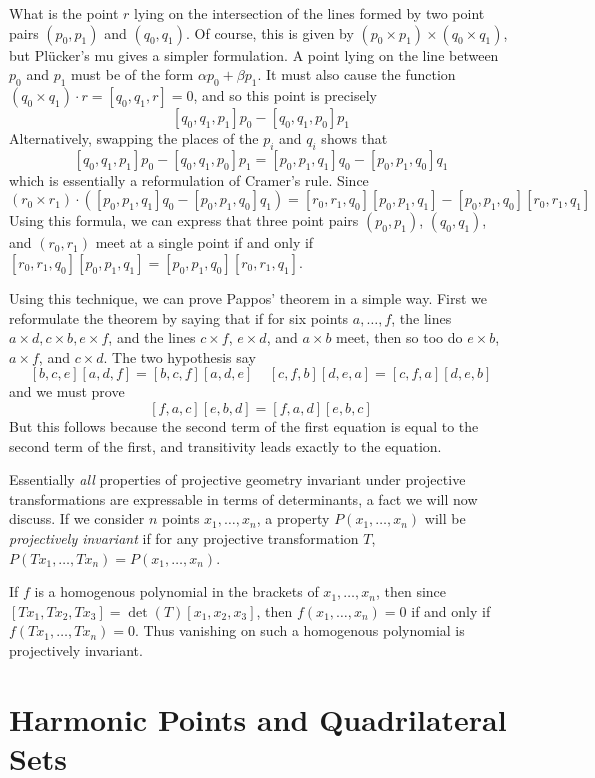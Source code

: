 \begin{example}
    What is the point $r$ lying on the intersection of the lines formed by two point pairs $(p_0,p_1)$ and $(q_0,q_1)$. Of course, this is given by $(p_0 \times p_1) \times (q_0 \times q_1)$, but Pl\"{u}cker's mu gives a simpler formulation. A point lying on the line between $p_0$ and $p_1$ must be of the form $\alpha p_0 + \beta p_1$. It must also cause the function $(q_0 \times q_1) \cdot r = [q_0,q_1,r] = 0$, and so this point is precisely
    \[ [q_0,q_1,p_1] p_0 - [q_0,q_1,p_0] p_1 \]
    Alternatively, swapping the places of the $p_i$ and $q_i$ shows that
    \[ [q_0,q_1,p_1] p_0 - [q_0,q_1,p_0] p_1 = [p_0,p_1,q_1] q_0 - [p_0,p_1,q_0] q_1 \]
    which is essentially a reformulation of Cramer's rule. Since
    \[ (r_0 \times r_1) \cdot ([p_0,p_1,q_1] q_0 - [p_0,p_1,q_0] q_1) = [r_0,r_1,q_0][p_0,p_1,q_1] - [p_0,p_1,q_0][r_0,r_1,q_1] \]
    Using this formula, we can express that three point pairs $(p_0,p_1)$, $(q_0,q_1)$, and $(r_0,r_1)$ meet at a single point if and only if $[r_0,r_1,q_0][p_0,p_1,q_1] = [p_0,p_1,q_0][r_0,r_1,q_1]$.
\end{example}

Using this technique, we can prove Pappos' theorem in a simple way. First we reformulate the theorem by saying that if for six points $a,\dots,f$, the lines $a \times d, c \times b, e \times f$, and the lines $c \times f$, $e \times d$, and $a \times b$ meet, then so too do $e \times b$, $a \times f$, and $c \times d$. The two hypothesis say
%
\[ [b,c,e][a,d,f] = [b,c,f][a,d,e]\ \ \ \ \ [c,f,b][d,e,a] = [c,f,a][d,e,b] \]
%
and we must prove
%
\[ [f,a,c][e,b,d] = [f,a,d][e,b,c] \]
%
But this follows because the second term of the first equation is equal to the second term of the first, and transitivity leads exactly to the equation.

Essentially {\it all} properties of projective geometry invariant under projective transformations are expressable in terms of determinants, a fact we will now discuss. If we consider $n$ points $x_1, \dots, x_n$, a property $P(x_1, \dots, x_n)$ will be {\it projectively invariant} if for any projective transformation $T$, $P(Tx_1, \dots, Tx_n) = P(x_1, \dots, x_n)$.

\begin{example}
    If $f$ is a homogenous polynomial in the brackets of $x_1, \dots, x_n$, then since $[Tx_1, Tx_2, Tx_3] = \det(T) [x_1, x_2, x_3]$, then $f(x_1, \dots, x_n) = 0$ if and only if $f(Tx_1, \dots, Tx_n) = 0$. Thus vanishing on such a homogenous polynomial is projectively invariant.
\end{example}

\section{Harmonic Points and Quadrilateral Sets}



